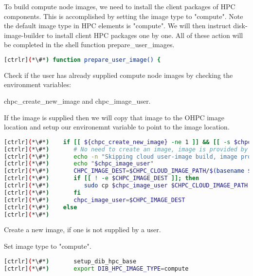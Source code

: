 	To build compute node images, we need to install the client packages of HPC components. This is accomplished by setting the image type to "compute". Note the default image type in HPC elements is "compute". We will then instruct disk-image-builder to install client HPC packages one by one. All of these action will be completed in the shell function prepare\_user\_images.

\begin{lstlisting}[language=bash,keywords={}]
[ctrlr](*\#*) function prepare_user_image() {

\end{lstlisting} 

	Check if the user has already supplied compute node images by checking the environment variables:
	
		 chpc\_create\_new\_image and chpc\_image\_user.
		  
	If the image is supplied then we will copy that image to the OHPC image location and setup our environemnt variable to point to the image location.
\begin{lstlisting}[language=bash,keywords={}]
[ctrlr](*\#*)    if [[ ${chpc_create_new_image} -ne 1 ]] && [[ -s $chpc_image_user ]]; then
[ctrlr](*\#*)       # No need to create an image, image is provided by the user
[ctrlr](*\#*)       echo -n "Skipping cloud user-image build, image provided:"
[ctrlr](*\#*)       echo "$chpc_image_user"
[ctrlr](*\#*)       CHPC_IMAGE_DEST=$CHPC_CLOUD_IMAGE_PATH/$(basename $chpc_image_user)
[ctrlr](*\#*)       if [[ ! -e $CHPC_IMAGE_DEST ]]; then
[ctrlr](*\#*)          sudo cp $chpc_image_user $CHPC_CLOUD_IMAGE_PATH
[ctrlr](*\#*)       fi
[ctrlr](*\#*)       chpc_image_user=$CHPC_IMAGE_DEST
[ctrlr](*\#*)    else
[ctrlr](*\#*)    

\end{lstlisting} 


	Create a new image, if one is not supplied by a user. 	
	
	Set image type to "compute".

\begin{lstlisting}[language=bash,keywords={}]
[ctrlr](*\#*)       setup_dib_hpc_base
[ctrlr](*\#*)       export DIB_HPC_IMAGE_TYPE=compute
\end{lstlisting} 

